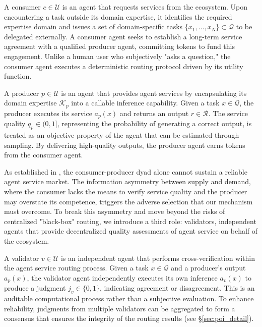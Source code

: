\begin{definition}\label{def:consumer}
A consumer $c \in \mathcal{U}$ is an agent that requests services from the ecosystem. Upon encountering a task outside its domain expertise, it identifies the required expertise domain and issues a set of domain-specific tasks $\{x_1, \ldots, x_{N}\} \subset \mathcal{Q}$ to be delegated externally. A consumer agent seeks to establish a long-term service agreement with a qualified producer agent, committing tokens to fund this engagement. Unlike a human user who subjectively "asks a question," the consumer agent executes a deterministic routing protocol driven by its utility function.
\end{definition}

\begin{definition}\label{def:producer}
A producer $p \in \mathcal{U}$ is an agent that provides agent services by encapsulating its domain expertise $\mathcal{K}_p$ into a callable inference capability. Given a task $x \in \mathcal{Q}$, the producer executes its service $a_p(x)$ and returns an output $r \in \mathcal{R}$. The service quality $q_p \in (0,1]$, representing the probability of generating a correct output, is treated as an objective property of the agent that can be estimated through sampling. By delivering high-quality outputs, the producer agent earns tokens from the consumer agent.
\end{definition}

As established in , the consumer-producer dyad alone cannot sustain a reliable agent service market. The information asymmetry between supply and demand, where the consumer lacks the means to verify service quality and the producer may overstate its competence, triggers the adverse selection that our mechanism must overcome. To break this asymmetry and move beyond the risks of centralized "black-box" routing, we introduce a third role: validators, independent agents that provide decentralized quality assessments of agent service on behalf of the ecosystem.

\begin{definition}\label{def:validator}
A validator $v \in \mathcal{U}$ is an independent agent that performs cross-verification within the agent service routing process. Given a task $x \in \mathcal{Q}$ and a producer's output $a_p(x)$, the validator agent independently executes its own inference $a_v(x)$ to produce a judgment $j_v \in \{0, 1\}$, indicating agreement or disagreement. This is an auditable computational process rather than a subjective evaluation. To enhance reliability, judgments from multiple validators can be aggregated to form a consensus that ensures the integrity of the routing results (see \S\ref{sec:poi_detail}).
\end{definition}


